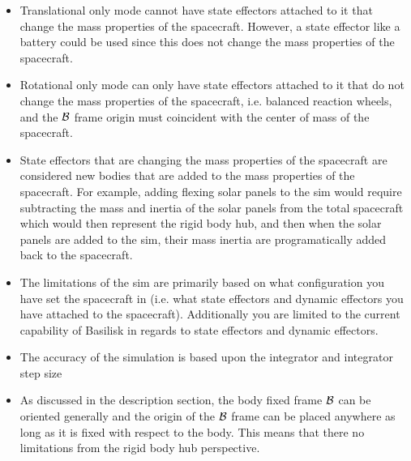 \begin{itemize}
	\item Translational only mode cannot have state effectors attached to it that change the mass properties of the spacecraft. However, a state effector like a battery could be used since this does not change the mass properties of the spacecraft.
	\item Rotational only mode can only have state effectors attached to it that do not change the mass properties of the spacecraft, i.e. balanced reaction wheels, and the $\cal{B}$ frame origin must coincident with the center of mass of the spacecraft. 
	\item State effectors that are changing the mass properties of the spacecraft are considered new bodies that are added to the mass properties of the spacecraft. For example, adding flexing solar panels to the sim would require subtracting the mass and inertia of the solar panels from the total spacecraft which would then represent the rigid body hub, and then when the solar panels are added to the sim, their mass inertia are programatically added back to the spacecraft.
	\item The limitations of the sim are primarily based on what configuration you have set the spacecraft in (i.e. what state effectors and dynamic effectors you have attached to the spacecraft). Additionally you are limited to the current capability of Basilisk in regards to state effectors and dynamic effectors. 
	\item The accuracy of the simulation is based upon the integrator and integrator step size
	\item As discussed in the description section, the body fixed frame $\cal{B}$ can be oriented generally and the origin of the $\cal{B}$ frame can be placed anywhere as long as it is fixed with respect to the body. This means that there no limitations from the rigid body hub perspective. 
\end{itemize}
